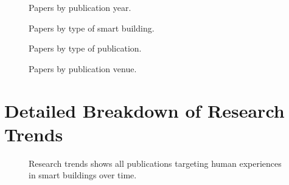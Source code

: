 \begin{widefigure}[tbp]
  \centering

  \begin{subfigure}{.48\linewidth}
    \centering
    
    \caption{Papers by publication year.}
    \label{fig:overview-years}
  \end{subfigure}
  \hfill
  \begin{subfigure}{.48\linewidth}
    \centering
    
    \caption{Papers by type of smart building.}
    \label{fig:overview-building}
  \end{subfigure}

  \vspace{.7\baselineskip}

  \begin{subfigure}{.48\linewidth}
    \centering
    
    \caption{Papers by type of publication.}
    \label{fig:overview-publication}
  \end{subfigure}
  \hfill
  \begin{subfigure}{.48\linewidth}
    \centering
    
    \caption{Papers by publication venue.}
    \label{fig:overview-venue}
  \end{subfigure}

  \caption{An overview of the characteristics of the papers included in the scoping review: publication year, type of smart building, publication type, and publication venue.}
  \label{fig:findings-overview}
\end{widefigure}




\section{Detailed Breakdown of Research Trends}
\label{sec:appendix-breakdown}

\begin{figure}[!htbp]
    \centering
    
    \caption{Research trends shows all publications targeting human experiences in smart buildings over time.}
    \label{fig:appendix-rq-trends}
\end{figure}

\newpage

